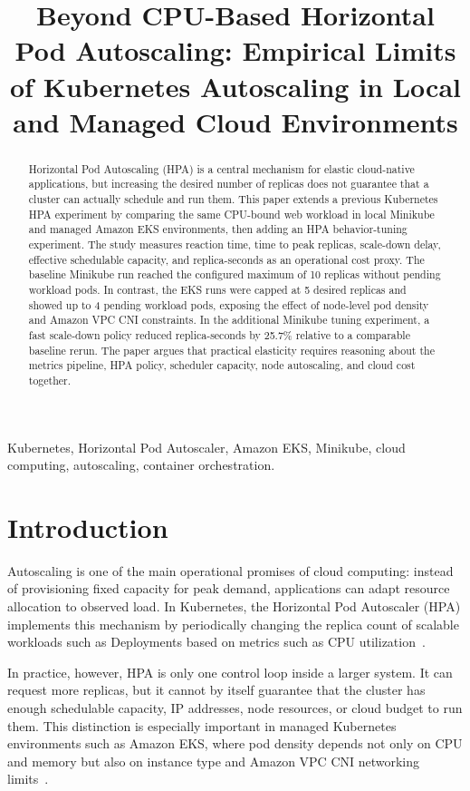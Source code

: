 \documentclass[conference]{IEEEtran}
\title{Beyond CPU-Based Horizontal Pod Autoscaling: Empirical Limits of Kubernetes Autoscaling in Local and Managed Cloud Environments}
\author{\IEEEauthorblockN{Ivo Motoki Makiyama Lopes}
\IEEEauthorblockA{Escola Politecnica, Universidade de Sao Paulo\\
PSI5120 -- Topicos de Computacao em Nuvem\\
ivo.motoki@usp.br\\
\url{https://github.com/IvoMotoki/psi5120-trabalho-hpa}}}
\begin{document}
\maketitle

\begin{abstract}
Horizontal Pod Autoscaling (HPA) is a central mechanism for elastic cloud-native applications, but increasing the desired number of replicas does not guarantee that a cluster can actually schedule and run them. This paper extends a previous Kubernetes HPA experiment by comparing the same CPU-bound web workload in local Minikube and managed Amazon EKS environments, then adding an HPA behavior-tuning experiment. The study measures reaction time, time to peak replicas, scale-down delay, effective schedulable capacity, and replica-seconds as an operational cost proxy. The baseline Minikube run reached the configured maximum of 10 replicas without pending workload pods. In contrast, the EKS runs were capped at 5 desired replicas and showed up to 4 pending workload pods, exposing the effect of node-level pod density and Amazon VPC CNI constraints. In the additional Minikube tuning experiment, a fast scale-down policy reduced replica-seconds by 25.7\% relative to a comparable baseline rerun. The paper argues that practical elasticity requires reasoning about the metrics pipeline, HPA policy, scheduler capacity, node autoscaling, and cloud cost together.
\end{abstract}

\begin{IEEEkeywords}
Kubernetes, Horizontal Pod Autoscaler, Amazon EKS, Minikube, cloud computing, autoscaling, container orchestration.
\end{IEEEkeywords}

\section{Introduction}

Autoscaling is one of the main operational promises of cloud computing: instead of provisioning fixed capacity for peak demand, applications can adapt resource allocation to observed load. In Kubernetes, the Horizontal Pod Autoscaler (HPA) implements this mechanism by periodically changing the replica count of scalable workloads such as Deployments based on metrics such as CPU utilization~\cite{kubernetes_hpa_concepts}.

In practice, however, HPA is only one control loop inside a larger system. It can request more replicas, but it cannot by itself guarantee that the cluster has enough schedulable capacity, IP addresses, node resources, or cloud budget to run them. This distinction is especially important in managed Kubernetes environments such as Amazon EKS, where pod density depends not only on CPU and memory but also on instance type and Amazon VPC CNI networking limits~\cite{aws_eks_vpc_cni}.
\end{document}
